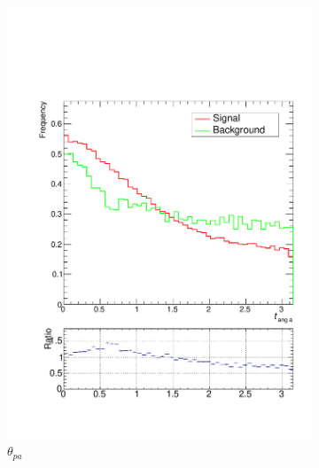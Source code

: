 \documentclass[10pt,a4paper]{book}
\begin{document}
\begin{figure}
\begin{subfigure}{.33\textwidth}
\includegraphics[scale=0.25]{truth/tang1}
\caption{$\theta_{pa}$}
\end{subfigure}
\begin{subfigure}{.33\textwidth}
\centering

\end{subfigure}
\end{figure}
\end{document}
